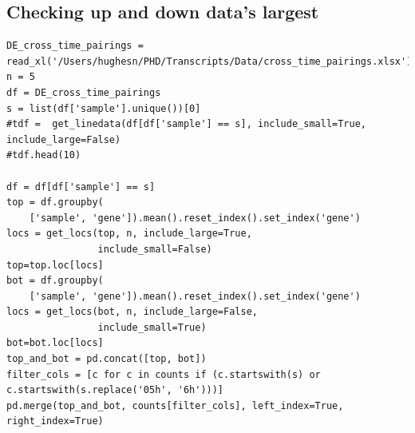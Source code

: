 \documentclass[11pt]{article}
\begin{document}
\subsection{Checking up and down data's largest}
\label{sec:org2bad081}

\begin{verbatim}
DE_cross_time_pairings = read_xl('/Users/hughesn/PHD/Transcripts/Data/cross_time_pairings.xlsx')
n = 5
df = DE_cross_time_pairings
s = list(df['sample'].unique())[0]
#tdf =  get_linedata(df[df['sample'] == s], include_small=True, include_large=False)
#tdf.head(10)

df = df[df['sample'] == s]
top = df.groupby(
    ['sample', 'gene']).mean().reset_index().set_index('gene')
locs = get_locs(top, n, include_large=True,
                include_small=False)
top=top.loc[locs]
bot = df.groupby(
    ['sample', 'gene']).mean().reset_index().set_index('gene')
locs = get_locs(bot, n, include_large=False,
                include_small=True)
bot=bot.loc[locs]
top_and_bot = pd.concat([top, bot])
filter_cols = [c for c in counts if (c.startswith(s) or c.startswith(s.replace('05h', '6h')))]
pd.merge(top_and_bot, counts[filter_cols], left_index=True, right_index=True)

\end{verbatim}
\end{document}
